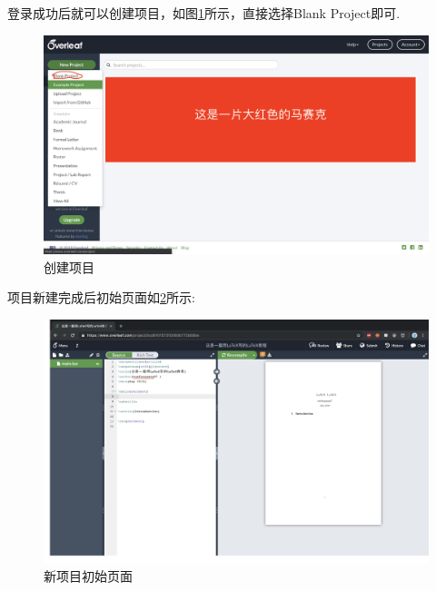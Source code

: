 \documentclass{article}
\begin{document}
登录成功后就可以创建项目，如图\ref{create-project-page}所示，直接选择Blank Project即可.


\begin{figure}[H]
\centering
\includegraphics[width=1\textwidth]{创建项目.png}
\caption{创建项目}
\label{create-project-page}
\end{figure}
项目新建完成后初始页面如\ref{init-page}所示:

\begin{figure}[H]
\centering
\includegraphics[width=1\textwidth]{init-page.png}
\caption{新项目初始页面}
\label{init-page}
\end{figure}
\end{document}
